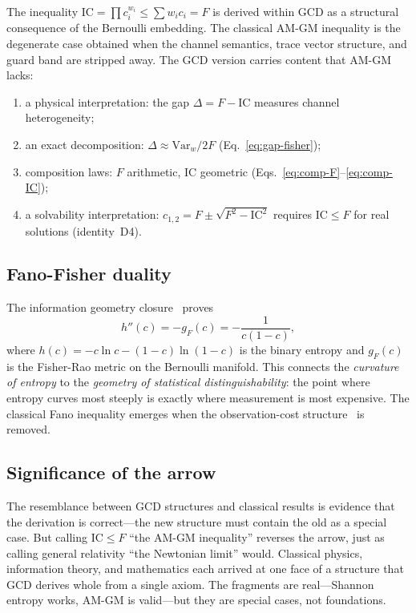 \documentclass[
  aps,
  prd,
  twocolumn,
  superscriptaddress,
  nofootinbib,
  floatfix
]{revtex4-2}
\newcommand{\beq}{\begin{equation}}
\newcommand{\eeq}{\end{equation}}
\newcommand{\IC}{\mathrm{IC}}
\newcommand{\gF}{g_{\!F}}
\begin{document}
The inequality $\IC = \prod c_i^{w_i} \leq \sum w_i c_i = F$ is
derived within GCD as a structural consequence of the Bernoulli
embedding.  The classical AM-GM inequality is the degenerate case
obtained when the channel semantics, trace vector structure, and
guard band are stripped away.  The GCD version carries content that
AM-GM lacks:
\begin{enumerate}[leftmargin=*,label=(\roman*)]
\item a physical interpretation: the gap $\Delta = F - \IC$ measures
  channel heterogeneity;
\item an exact decomposition: $\Delta \approx \mathrm{Var}_w/2F$
  (Eq.~\ref{eq:gap-fisher});
\item composition laws: $F$ arithmetic, $\IC$ geometric
  (Eqs.~\ref{eq:comp-F}--\ref{eq:comp-IC});
\item a solvability interpretation: $c_{1,2} = F \pm \sqrt{F^2 - \IC^2}$
  requires $\IC \leq F$ for real solutions (identity~D4).
\end{enumerate}

\subsection{Fano-Fisher duality}\label{sec:fanofisher}

The information geometry
closure~\cite{paulus2025physicscoherence} proves
\beq\label{eq:fano-fisher}
  h''(c) = -\gF(c) = -\frac{1}{c(1-c)},
\eeq
where $h(c) = -c\ln c - (1{-}c)\ln(1{-}c)$ is the binary entropy
and $\gF(c)$ is the Fisher-Rao metric on the Bernoulli manifold.
This connects the \emph{curvature of entropy} to the \emph{geometry
of statistical distinguishability}: the point where entropy curves
most steeply is exactly where measurement is most expensive.
The classical Fano inequality emerges when the observation-cost
structure~\cite{paulus2025seamreality} is removed.

\subsection{Significance of the arrow}

The resemblance between GCD structures and classical results is
evidence that the derivation is correct---the new structure must
contain the old as a special case.  But calling $\IC \leq F$ ``the
AM-GM inequality'' reverses the arrow, just as calling general
relativity ``the Newtonian limit'' would.  Classical physics,
information theory, and mathematics each arrived at one face of a
structure that GCD derives whole from a single axiom.  The fragments
are real---Shannon entropy works, AM-GM is valid---but they are
special cases, not foundations.
\end{document}
